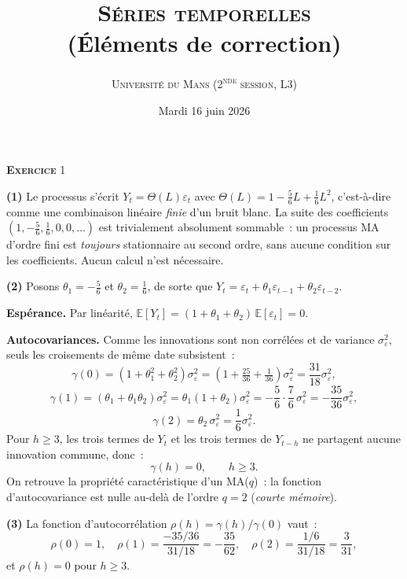 \documentclass[11pt,a4paper,notitlepage]{article}
\newcommand{\exercice}[1]{\textsc{\textbf{Exercice}} #1}
\newcommand{\question}[1]{\textbf{(#1)}}
\begin{document}
\title{\textsc{Séries temporelles}\\(Éléments de correction)}
\author{\textsc{Université du Mans (2\textsuperscript{nde} session, L3)}}
\date{Mardi 16 juin 2026}


\maketitle

\exercice{1}\newline

\question{1} Le processus s'écrit $Y_t = \Theta(L)\varepsilon_t$ avec
$\Theta(L) = 1 - \frac{5}{6}L + \frac{1}{6}L^2$, c'est-à-dire comme une
combinaison linéaire \emph{finie} d'un bruit blanc. La suite des
coefficients $(1,-\frac{5}{6},\frac{1}{6},0,0,\dots)$ est trivialement
absolument sommable~: un processus MA d'ordre fini est
\emph{toujours} stationnaire au second ordre, sans aucune condition sur
les coefficients. Aucun calcul n'est nécessaire.\newline

\question{2} Posons $\theta_1 = -\frac{5}{6}$ et $\theta_2 =
\frac{1}{6}$, de sorte que $Y_t = \varepsilon_t + \theta_1
\varepsilon_{t-1} + \theta_2\varepsilon_{t-2}$.\newline

\textbf{Espérance.} Par linéarité, $\mathbb E[Y_t] = (1 + \theta_1 +
\theta_2)\,\mathbb E[\varepsilon_t] = 0$.\newline

\textbf{Autocovariances.} Comme les innovations sont non corrélées et
de variance $\sigma_{\varepsilon}^2$, seuls les croisements de même
date subsistent~:
\[
\gamma(0) = (1+\theta_1^2+\theta_2^2)\sigma_{\varepsilon}^2
= \left(1+\tfrac{25}{36}+\tfrac{1}{36}\right)\sigma_{\varepsilon}^2
= \frac{31}{18}\sigma_{\varepsilon}^2,
\]
\[
\gamma(1) = (\theta_1 + \theta_1\theta_2)\sigma_{\varepsilon}^2
= \theta_1(1+\theta_2)\sigma_{\varepsilon}^2
= -\frac{5}{6}\cdot\frac{7}{6}\,\sigma_{\varepsilon}^2
= -\frac{35}{36}\sigma_{\varepsilon}^2,
\]
\[
\gamma(2) = \theta_2\,\sigma_{\varepsilon}^2 = \frac{1}{6}\sigma_{\varepsilon}^2.
\]
Pour $h\geq 3$, les trois termes de $Y_t$ et les trois termes de
$Y_{t-h}$ ne partagent aucune innovation commune, donc~:
\[
\gamma(h) = 0,\qquad h\geq 3.
\]
On retrouve la propriété caractéristique d'un MA($q$)~: la fonction
d'autocovariance est nulle au-delà de l'ordre $q=2$ (\emph{courte
mémoire}).\newline

\question{3} La fonction d'autocorrélation $\rho(h) =
\gamma(h)/\gamma(0)$ vaut~:
\[
\rho(0)=1,\quad
\rho(1) = \frac{-35/36}{31/18} = -\frac{35}{62},\quad
\rho(2) = \frac{1/6}{31/18} = \frac{3}{31},
\]
et $\rho(h)=0$ pour $h\geq 3$.\newline
\end{document}
